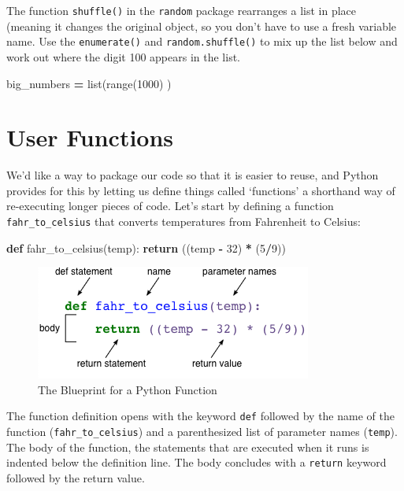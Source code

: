 \documentclass[]{book}
\newenvironment{Shaded}{\begin{snugshade}}{\end{snugshade}}
\newcommand{\BuiltInTok}[1]{#1}
\newcommand{\ControlFlowTok}[1]{\textcolor[rgb]{0.13,0.29,0.53}{\textbf{#1}}}
\newcommand{\DecValTok}[1]{\textcolor[rgb]{0.00,0.00,0.81}{#1}}
\newcommand{\KeywordTok}[1]{\textcolor[rgb]{0.13,0.29,0.53}{\textbf{#1}}}
\newcommand{\NormalTok}[1]{#1}
\newcommand{\OperatorTok}[1]{\textcolor[rgb]{0.81,0.36,0.00}{\textbf{#1}}}
\theoremstyle{definition}
\theoremstyle{definition}
\theoremstyle{definition}
\theoremstyle{remark}
\begin{document}
The function \texttt{shuffle()} in the \texttt{random} package
rearranges a list in place (meaning it changes the original object, so
you don't have to use a fresh variable name. Use the
\texttt{enumerate()} and \texttt{random.shuffle()} to mix up the list
below and work out where the digit 100 appears in the list.

\begin{Shaded}
\begin{Highlighting}[]
\NormalTok{big_numbers }\OperatorTok{=} \BuiltInTok{list}\NormalTok{(}\BuiltInTok{range}\NormalTok{(}\DecValTok{1000}\NormalTok{) )}
\end{Highlighting}
\end{Shaded}

\hypertarget{user-functions}{%
\chapter{User Functions}\label{user-functions}}

We'd like a way to package our code so that it is easier to reuse, and
Python provides for this by letting us define things called `functions'
a shorthand way of re-executing longer pieces of code. Let's start by
defining a function \texttt{fahr\_to\_celsius} that converts
temperatures from Fahrenheit to Celsius:

\begin{Shaded}
\begin{Highlighting}[]
\KeywordTok{def}\NormalTok{ fahr_to_celsius(temp):}
    \ControlFlowTok{return}\NormalTok{ ((temp }\OperatorTok{-} \DecValTok{32}\NormalTok{) }\OperatorTok{*}\NormalTok{ (}\DecValTok{5}\OperatorTok{/}\DecValTok{9}\NormalTok{))}
\end{Highlighting}
\end{Shaded}

\begin{figure}
\centering
\includegraphics{assets/python-function.png}
\caption{The Blueprint for a Python Function}
\end{figure}

The function definition opens with the keyword \texttt{def} followed by
the name of the function (\texttt{fahr\_to\_celsius}) and a
parenthesized list of parameter names (\texttt{temp}). The body of the
function, the statements that are executed when it runs is indented
below the definition line. The body concludes with a \texttt{return}
keyword followed by the return value.
\end{document}
